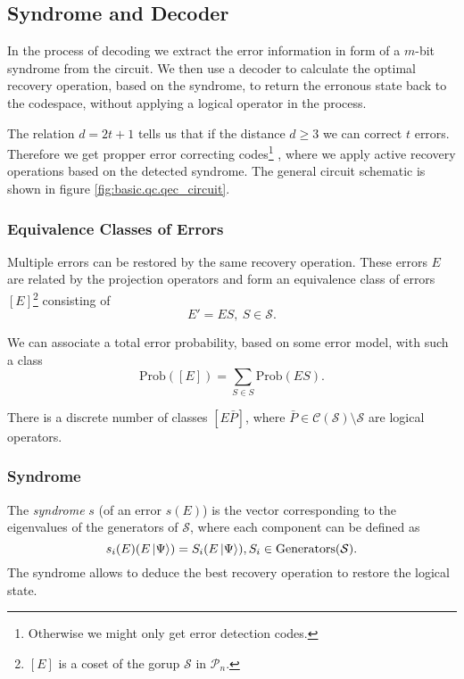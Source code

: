 \newpage
\subsection{Syndrome and Decoder}
In the process of decoding we extract the error information in form of a $m$-bit syndrome from the circuit. 
We then use a decoder to calculate the optimal recovery operation, based on the syndrome, 
to return the erronous state back to the codespace,
without applying a logical operator in the process.

The relation $d = 2t+1$ tells us that if the distance $d\ge 3$ we can correct $t$ errors.
Therefore we get propper error correcting codes\footnote{Otherwise we might only get error detection codes.}
, where we apply active recovery operations based on the detected syndrome.
The general circuit schematic is shown in figure \ref{fig:basic.qc.qec_circuit}. \cite{QECintro}


\subsubsection{Equivalence Classes of Errors}
Multiple errors can be restored by the same recovery operation.
These errors $E$ are related by the projection operators and form an equivalence class of errors $[E]$\footnote{
    $[E]$ is a coset of the gorup $\mathcal{S}$ in $\mathcal{P}_n$. 
} consisting of
\begin{equation}
    E' = ES, \  S \in \mathcal{S}.
\end{equation}

We can associate a total error probability, based on some error model, with such a class 
\begin{equation}
    \text{Prob}([E]) = \sum_{S\in S} \text{Prob}(ES).
\end{equation}

There is a discrete number of classes $[E\bar{P}]$, where $\bar{P}\in \mathcal{C}(\mathcal{S}) \setminus \mathcal{S}$ are logical operators. \cite{QECmemory}


\subsubsection{Syndrome}
The \textit{syndrome} $s$ (of an error $s(E)$) is the vector corresponding to the eigenvalues of the generators of $\mathcal{S}$, where each component can be defined as 
\begin{equation}
    s_i(E) (E\ket{\Psi}) = S_i (E \ket{\Psi}), S_i \in \text{Generators}(\mathcal{S}).
\end{equation}
The syndrome allows to deduce the best recovery operation to restore the logical state.

